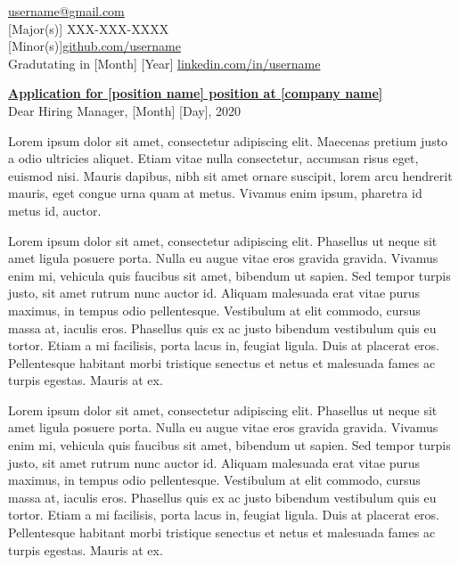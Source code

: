 \documentclass{article}
\begin{document}
 \hfill \large\href{mailto:username@gmail.com}
  {username@gmail.com \faEnvelope} \\
{\large [Major(s)]} \hfill {XXX-XXX-XXXX  \hspace{2.5pt}\faPhone}\\
{\large [Minor(s)]}\hfill \large\href{https://github.com/username}
  {github.com/username \faGithub} \\
{\large Gradutating in [Month] [Year]} \hfill \large\href{https://www.linkedin.com/in/username}
  {linkedin.com/in/username \faLinkedinSquare}

\vspace{.5em}

{\noindent\Large
\textbf{\underline{Application for [position name] position at [company name]}} \vspace{.5em} \\
Dear Hiring Manager, \hfill [Month] [Day], 2020}

\vspace{.5em}

{\Large\noindent 
Lorem ipsum dolor sit amet, consectetur adipiscing elit. Maecenas pretium justo a odio ultricies aliquet. Etiam vitae nulla consectetur, accumsan risus eget, euismod nisi. Mauris dapibus, nibh sit amet ornare suscipit, lorem arcu hendrerit mauris, eget congue urna quam at metus. Vivamus enim ipsum, pharetra id metus id, auctor.
}

\vspace{.5em}

{\Large\noindent
Lorem ipsum dolor sit amet, consectetur adipiscing elit. Phasellus ut neque sit amet ligula posuere porta. Nulla eu augue vitae eros gravida gravida. Vivamus enim mi, vehicula quis faucibus sit amet, bibendum ut sapien. Sed tempor turpis justo, sit amet rutrum nunc auctor id. Aliquam malesuada erat vitae purus maximus, in tempus odio pellentesque. Vestibulum at elit commodo, cursus massa at, iaculis eros. Phasellus quis ex ac justo bibendum vestibulum quis eu tortor. Etiam a mi facilisis, porta lacus in, feugiat ligula. Duis at placerat eros. Pellentesque habitant morbi tristique senectus et netus et malesuada fames ac turpis egestas. Mauris at ex.
}

\vspace{.5em}

{\Large\noindent Lorem ipsum dolor sit amet, consectetur adipiscing elit. Phasellus ut neque sit amet ligula posuere porta. Nulla eu augue vitae eros gravida gravida. Vivamus enim mi, vehicula quis faucibus sit amet, bibendum ut sapien. Sed tempor turpis justo, sit amet rutrum nunc auctor id. Aliquam malesuada erat vitae purus maximus, in tempus odio pellentesque. Vestibulum at elit commodo, cursus massa at, iaculis eros. Phasellus quis ex ac justo bibendum vestibulum quis eu tortor. Etiam a mi facilisis, porta lacus in, feugiat ligula. Duis at placerat eros. Pellentesque habitant morbi tristique senectus et netus et malesuada fames ac turpis egestas. Mauris at ex.}
\end{document}
